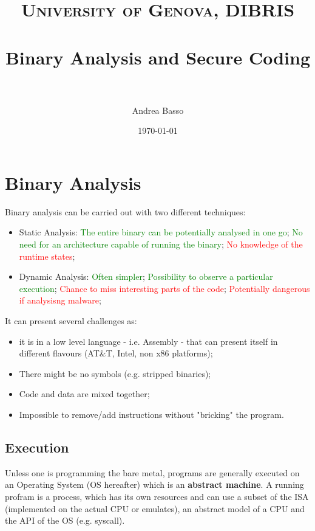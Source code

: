 \documentclass[paper=a4, fontsize=11pt]{report} %
\title{	
\normalfont \normalsize 
\textsc{University of Genova, DIBRIS} \\ [25pt]
\horrule{0.5pt} \\[0.4cm] %
\huge Binary Analysis and Secure Coding \\
\horrule{2pt} \\[0.5cm] %
}
\author{Andrea Basso} %
\date{\normalsize\today} %
\numberwithin{equation}{section} %
\numberwithin{figure}{section} %
\numberwithin{table}{section} %
\begin{document}
\maketitle %
\tableofcontents
\chapter{Binary Analysis}
Binary analysis can be carried out with two different techniques:
\begin{itemize}
	\item Static Analysis:
		\subitem \textcolor{green}{The entire binary can be potentially 
		analysed in one go};
		\subitem \textcolor{green}{No need for an architecture capable of 
		running the binary};
		\subitem \textcolor{red}{No knowledge of the runtime states};
	\item Dynamic Analysis:
		\subitem \textcolor{green}{Often simpler};
		\subitem \textcolor{green}{Possibility to observe a particular 
		execution};
		\subitem \textcolor{red}{Chance to miss interesting parts of the code};
		\subitem \textcolor{red}{Potentially dangerous if analysisng malware};
\end{itemize}
It can present several challenges as:
\begin{itemize}
	\item it is in a low level language - i.e. Assembly - that can present 
	itself in different flavours (AT\&T, Intel, non x86 platforms);
	\item There might be no symbols (e.g. stripped binaries);
	\item Code and data are mixed together;
	\item Impossible to remove/add instructions without "bricking" the program.
\end{itemize}
\section{Execution}
Unless one is programming the bare metal, programs are generally executed on an 
Operating System (OS hereafter) which is an \textbf{abstract machine}.
A running profram is a process, which has its own resources and can use a 
subset of the ISA (implemented on the actual CPU or emulates), an abstract 
model of a CPU and the API of the OS (e.g. syscall).
\end{document}
